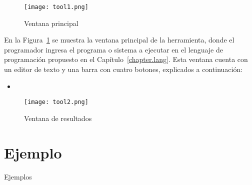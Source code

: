 \begin{figure}[htbp] %
   \centering
   \texttt{[image: tool1.png]}
   \caption{Ventana principal}
   \label{fig:tool1}
\end{figure}

En la Figura~\ref{fig:tool1} se muestra la ventana principal de la herramienta, donde el programador ingresa el programa o sistema a ejecutar en el lenguaje de programaci\'on propuesto en el Cap\'itulo~\ref{chapter.lang}. Esta ventana cuenta con un editor de texto y una barra con cuatro botones, explicados a continuaci\'on:

\begin{itemize}
\item
\end{itemize}

\begin{figure}[htbp] %
   \centering
   \texttt{[image: tool2.png]} 
   \caption{Ventana de resultados}
   \label{fig:tool2}
\end{figure}



\section{Ejemplo}
\label{example.envir}

Ejemplos